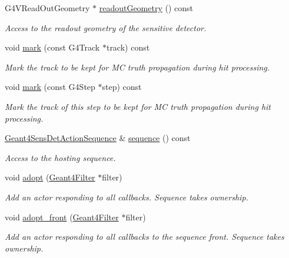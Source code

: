 \begin{DoxyCompactItemize}
G4\+V\+Read\+Out\+Geometry $\ast$ \hyperlink{class_d_d4hep_1_1_simulation_1_1_geant4_sensitive_a083cae521f044d12130c5325dbee69bf}{readout\+Geometry} () const
\begin{DoxyCompactList}\small\item\em Access to the readout geometry of the sensitive detector. \end{DoxyCompactList}\item 
void \hyperlink{class_d_d4hep_1_1_simulation_1_1_geant4_sensitive_a5dd1e49bfcc1937ad6dc302f969ee544}{mark} (const G4\+Track $\ast$track) const
\begin{DoxyCompactList}\small\item\em Mark the track to be kept for MC truth propagation during hit processing. \end{DoxyCompactList}\item 
void \hyperlink{class_d_d4hep_1_1_simulation_1_1_geant4_sensitive_a3a5b62f53f7a9c9a07910716cc85e3aa}{mark} (const G4\+Step $\ast$step) const
\begin{DoxyCompactList}\small\item\em Mark the track of this step to be kept for MC truth propagation during hit processing. \end{DoxyCompactList}\item 
\hyperlink{class_d_d4hep_1_1_simulation_1_1_geant4_sens_det_action_sequence}{Geant4\+Sens\+Det\+Action\+Sequence} \& \hyperlink{class_d_d4hep_1_1_simulation_1_1_geant4_sensitive_a460ae8107334780c1c69982c7b054e41}{sequence} () const
\begin{DoxyCompactList}\small\item\em Access to the hosting sequence. \end{DoxyCompactList}\item 
void \hyperlink{class_d_d4hep_1_1_simulation_1_1_geant4_sensitive_ac1a68f5a62579041a301c8f3b3389175}{adopt} (\hyperlink{class_d_d4hep_1_1_simulation_1_1_geant4_filter}{Geant4\+Filter} $\ast$filter)
\begin{DoxyCompactList}\small\item\em Add an actor responding to all callbacks. Sequence takes ownership. \end{DoxyCompactList}\item 
void \hyperlink{class_d_d4hep_1_1_simulation_1_1_geant4_sensitive_a38dc5d69581c1acf08eb7aed152cf3f6}{adopt\+\_\+front} (\hyperlink{class_d_d4hep_1_1_simulation_1_1_geant4_filter}{Geant4\+Filter} $\ast$filter)
\begin{DoxyCompactList}\small\item\em Add an actor responding to all callbacks to the sequence front. Sequence takes ownership. \end{DoxyCompactList}\item 

\end{DoxyCompactItemize}
